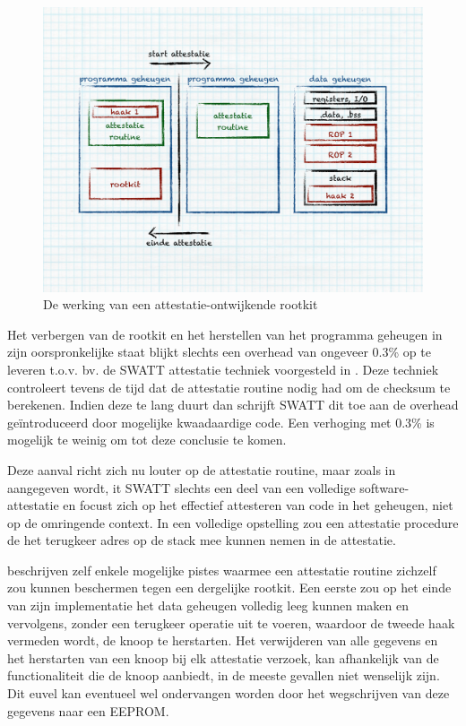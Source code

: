 \begin{figure}[ht]
  \centering
  \includegraphics[width=0.9\linewidth]{resources/attestation-rootkit.pdf}
  \caption{De werking van een attestatie-ontwijkende rootkit}
  \label{fig:attestation-rootkit}
\end{figure}

Het verbergen van de rootkit en het herstellen van het programma geheugen in
zijn oorspronkelijke staat blijkt slechts een overhead van ongeveer 0.3\% op te
leveren t.o.v. bv. de SWATT attestatie techniek voorgesteld in
\citep{seshadri2004swatt}. Deze techniek controleert tevens de tijd dat de
attestatie routine nodig had om de checksum te berekenen. Indien deze te lang
duurt dan schrijft SWATT dit toe aan de overhead ge\"introduceerd door
mogelijke kwaadaardige code. Een verhoging met 0.3\% is mogelijk te weinig om
tot deze conclusie te komen.

Deze aanval richt zich nu louter op de attestatie routine, maar zoals in
\citep{perrig2010refutation} aangegeven wordt, it SWATT slechts een deel van een
volledige software-attestatie en focust zich op het effectief attesteren van
code in het geheugen, niet op de omringende context. In een volledige
opstelling zou een attestatie procedure de het terugkeer adres op de stack mee
kunnen nemen in de attestatie.

\citep{castelluccia2009difficulty} beschrijven zelf enkele mogelijke pistes
waarmee een attestatie routine zichzelf zou kunnen beschermen tegen een
dergelijke rootkit. Een eerste zou op het einde van zijn implementatie het data
geheugen volledig leeg kunnen maken en vervolgens, zonder een terugkeer
operatie uit te voeren, waardoor de tweede haak vermeden wordt, de knoop te
herstarten. Het verwijderen van alle gegevens en het herstarten van een knoop
bij elk attestatie verzoek, kan afhankelijk van de functionaliteit die de knoop
aanbiedt, in de meeste gevallen niet wenselijk zijn. Dit euvel kan eventueel
wel ondervangen worden door het wegschrijven van deze gegevens naar een EEPROM.


